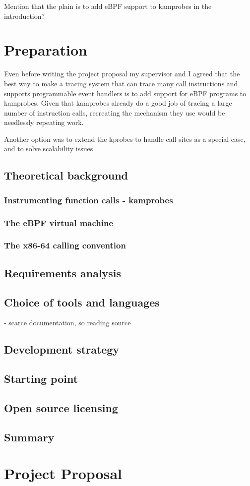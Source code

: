\documentclass[12pt,twoside,notitlepage]{report}
\begin{document}
		Mention that the plain is to add eBPF support to kamprobes in the introduction?


\chapter{Preparation}

	Even before writing the project proposal my supervisor and I agreed that the best way to make a tracing system that can trace many call instructions and supports programmable event handlers is to add support for eBPF programs to kamprobes. Given that kamprobes already do a good job of tracing a large number of instruction calls, recreating the mechanism they use would be needlessly repeating work.

	Another option was to extend the kprobes to handle call sites as a special case, and to solve scalability issues 

    \section{Theoretical background} 
        \subsection{Instrumenting function calls - kamprobes}
        \subsection{The eBPF virtual machine}
		\subsection{The x86-64 calling convention}
   
    \section {Requirements analysis} 
        
    \section{Choice of tools and languages}

        - scarce documentation, so reading source

    \section{Development strategy}

    \section{Starting point}

    \section{Open source licensing}

    \section{Summary}

\printbibliography

\chapter*{Project Proposal}

%
\end{document}
